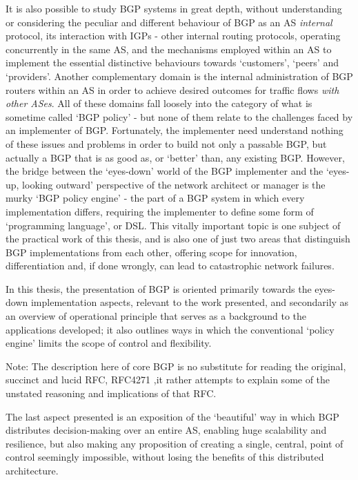 It is also possible to study BGP systems in great depth, without understanding or considering the peculiar and different behaviour of BGP as an AS \textit{internal} protocol, its interaction with IGPs - other internal routing protocols, operating concurrently in the same AS, and the mechanisms employed within an AS to implement the essential distinctive behaviours towards `customers', `peers' and `providers'.
Another complementary domain is the internal administration of BGP routers within an AS in order to achieve desired outcomes for traffic flows \textit{with other ASes}.
All of these domains fall loosely into the category of what is sometime called `BGP policy' - but none of them relate to the challenges faced by an implementer of BGP.
Fortunately, the implementer need understand nothing of these issues and problems in order to build not only a passable BGP, but actually a BGP that is as good as, or `better' than, any existing BGP.
However, the bridge between the `eyes-down' world of the BGP implementer and the `eyes-up, looking outward' perspective of the network architect or manager is the murky `BGP policy engine' - the part of a BGP system in which every implementation differs, requiring the implementer to define some form of `programming language', or DSL. This vitally important topic is one subject of the practical work of this thesis, and is also one of just two areas that distinguish BGP implementations from each other, offering scope for innovation, differentiation and, if done wrongly, can lead to catastrophic network failures.

In this thesis, the presentation of BGP is oriented primarily towards the eyes-down implementation aspects, relevant to the work presented, and secondarily as an overview of operational principle that serves as a background to the applications developed; it also outlines ways in which the conventional `policy engine' limits the scope of control and flexibility.

\medskip

Note: The description here of core BGP is no substitute for reading the original, succinct and lucid RFC, RFC4271 \cite{rfc4271},it rather attempts to explain some of the unstated reasoning and implications of that RFC.

\medskip

The last aspect presented is an exposition of the `beautiful' way in which BGP distributes decision-making over an entire AS, enabling huge scalability and resilience, but also making any proposition of creating a single, central, point of control seemingly impossible, without losing the benefits of this distributed architecture.

